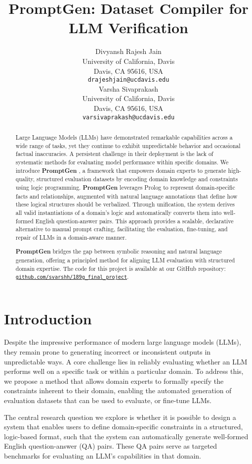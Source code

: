 \documentclass{article}
\title{PromptGen: Dataset Compiler for LLM Verification}
\author{ 
    Divyansh Rajesh Jain \\
    University of California, Davis \\
    Davis, CA 95616, USA \\
    \texttt{drajeshjain@ucdavis.edu} \\
    \And
    Varsha Sivaprakash\\
    University of California, Davis \\
    Davis, CA 95616, USA \\
    \texttt{varsivaprakash@ucdavis.edu} \\
}
\newcommand{\PromptGen}{
    {\bfseries PromptGen}
}
\begin{document}
\maketitle


\begin{abstract}
  Large Language Models (LLMs) have demonstrated remarkable capabilities across a wide range of tasks, 
  yet they continue to exhibit unpredictable behavior and occasional factual inaccuracies. 
  A persistent challenge in their deployment is the lack of systematic methods for evaluating model 
  performance within specific domains. We introduce \PromptGen, a framework that empowers domain experts 
  to generate high-quality, structured evaluation datasets by encoding domain knowledge and constraints 
  using logic programming. \PromptGen leverages Prolog to represent domain-specific facts and relationships, 
  augmented with natural language annotations that define how these logical structures should be verbalized. 
  Through unification, the system derives all valid instantiations of a domain’s logic and automatically converts 
  them into well-formed English question-answer pairs. This approach provides a scalable, declarative alternative 
  to manual prompt crafting, facilitating the evaluation, fine-tuning, and repair of LLMs in a domain-aware manner. 
  \PromptGen bridges the gap between symbolic reasoning and natural language generation, offering a principled method 
  for aligning LLM evaluation with structured domain expertise.
  The code for this project is available at our GitHub repository: \href{https://github.com/svarshh/189g_final_project}{\texttt{github.com/svarshh/189g\_final\_project}}.
\end{abstract}

\section{Introduction}
Despite the impressive performance of modern large language models (LLMs), 
they remain prone to generating incorrect or inconsistent outputs in 
unpredictable ways. A core challenge lies in reliably evaluating whether 
an LLM performs well on a specific task or within a particular domain. 
To address this, we propose a method that allows domain experts to formally 
specify the constraints inherent to their domain, enabling the automated 
generation of evaluation datasets that can be used to evaluate, or fine-tune LLMs.

The central research question we explore is whether it is possible to design 
a system that enables users to define domain-specific constraints in a structured, 
logic-based format, such that the system can automatically generate well-formed 
English question-answer (QA) pairs. These QA pairs serve as targeted benchmarks 
for evaluating an LLM’s capabilities in that domain.
\end{document}
